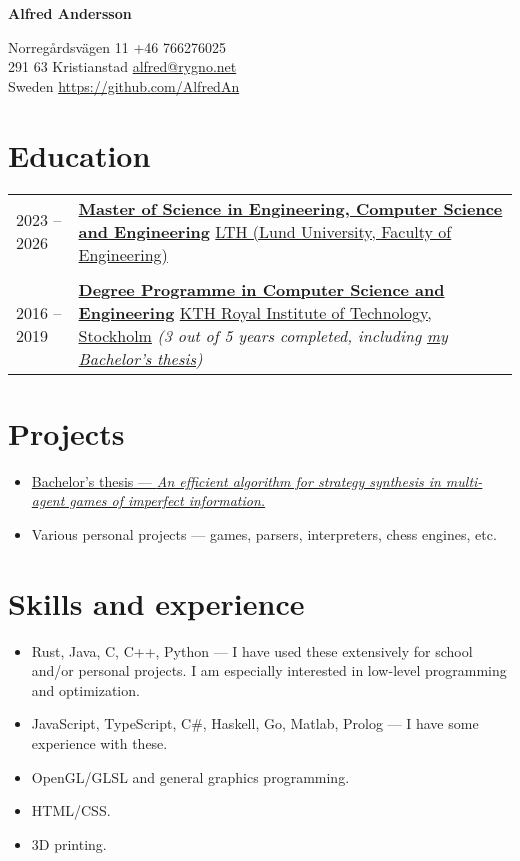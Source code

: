 \documentclass[11pt]{article}
\begin{document}
\begin{center}
     \Huge{\textbf{Alfred Andersson}}
\end{center}
Norregårdsvägen 11 \hfill +46 766276025 \\
291 63 Kristianstad \hfill \href{mailto:alfred@rygno.net}{alfred@rygno.net} \\ 
Sweden \hfill \url{https://github.com/AlfredAn}

\section{Education}
\begin{tabular}{ l p{405pt} }
    2023 -- 2026 & \href{https://www.lth.se/utbildning/datateknik300/}{\textbf{Master of Science in Engineering, Computer Science and Engineering}}
    \newline \href{https://www.lth.se/english/}{LTH (Lund University, Faculty of Engineering)} \\ \\

    2016 -- 2019 & \href{https://www.kth.se/utbildning/civilingenjor/datateknik}{\textbf{Degree Programme in Computer Science and Engineering}}
    \newline \href{https://www.kth.se/en}{KTH Royal Institute of Technology, Stockholm}
    \newline \textit{(3 out of 5 years completed, including \href{https://kth.diva-portal.org/smash/record.jsf?pid=diva2\%3A1701708\&dswid=-199}{my Bachelor's thesis})}
\end{tabular}

\section{Projects}
\begin{itemize}
    \item \href{https://kth.diva-portal.org/smash/record.jsf?pid=diva2\%3A1701708\&dswid=-199}{Bachelor's thesis --- \textit{An efficient algorithm for strategy synthesis in multi-agent games of imperfect information.}}
    \item Various personal projects --- games, parsers, interpreters, chess engines, etc.
\end{itemize}

\section{Skills and experience}
\begin{itemize}
    \item Rust, Java, C, C++, Python --- I have used these extensively for school and/or personal projects. I am especially interested in low-level programming and optimization.
    \item JavaScript, TypeScript, C\#, Haskell, Go, Matlab, Prolog --- I have some experience with these.
    \item OpenGL/GLSL and general graphics programming.
    \item HTML/CSS.
    \item 3D printing.
\end{itemize}
\end{document}

